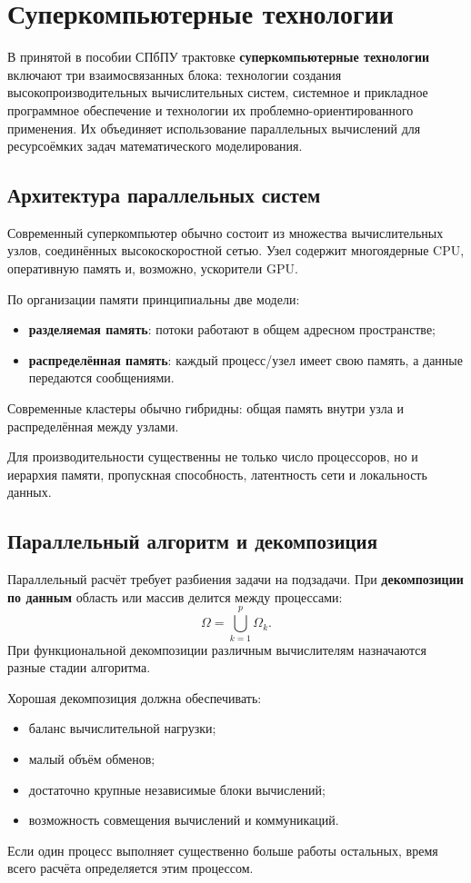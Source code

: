 \section{Суперкомпьютерные технологии}

В принятой в пособии СПбПУ трактовке \textbf{суперкомпьютерные технологии} включают три взаимосвязанных блока: технологии создания высокопроизводительных вычислительных систем, системное и прикладное программное обеспечение и технологии их проблемно-ориентированного применения. Их объединяет использование параллельных вычислений для ресурсоёмких задач математического моделирования.

\subsection{Архитектура параллельных систем}

Современный суперкомпьютер обычно состоит из множества вычислительных узлов, соединённых высокоскоростной сетью. Узел содержит многоядерные CPU, оперативную память и, возможно, ускорители GPU.

По организации памяти принципиальны две модели:
\begin{itemize}
\item \textbf{разделяемая память}: потоки работают в общем адресном пространстве;
\item \textbf{распределённая память}: каждый процесс/узел имеет свою память, а данные передаются сообщениями.
\end{itemize}
Современные кластеры обычно гибридны: общая память внутри узла и распределённая между узлами.

Для производительности существенны не только число процессоров, но и иерархия памяти, пропускная способность, латентность сети и локальность данных.

\subsection{Параллельный алгоритм и декомпозиция}

Параллельный расчёт требует разбиения задачи на подзадачи. При \textbf{декомпозиции по данным} область или массив делится между процессами:
\[
\Omega=\bigcup_{k=1}^{p}\Omega_k.
\]
При функциональной декомпозиции различным вычислителям назначаются разные стадии алгоритма.

Хорошая декомпозиция должна обеспечивать:
\begin{itemize}
\item баланс вычислительной нагрузки;
\item малый объём обменов;
\item достаточно крупные независимые блоки вычислений;
\item возможность совмещения вычислений и коммуникаций.
\end{itemize}
Если один процесс выполняет существенно больше работы остальных, время всего расчёта определяется этим процессом.

